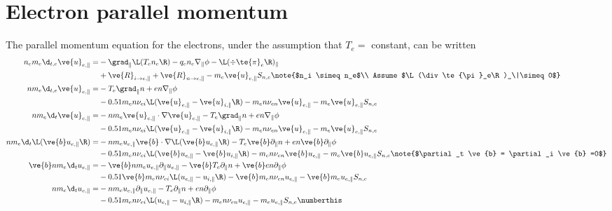 \section{Electron parallel momentum}
The parallel momentum equation for the electrons, under the assumption that $T_e=$
constant, can be written
%
\begin{align*}
 n_em_e\d_{t,e} \ve{u}_{e,\|}
 =&
 - \grad_\| \L(T_e n_e\R)
 - q_en_e \nabla_\|\phi
 - \L(\div\te{\pi}_e\R)_\|
 \\
 &
 + \ve{R}_{i\to e, \|}
 + \ve{R}_{n\to e, \|}
 - m_e\ve{u}_{e,\|}S_{n,e}
 \note{$n_i \simeq n_e$\\
     Assume $\L(\div\te{\pi}_e\R)_\|\simeq0$}
 \\
%
%
 n m_e\d_{t,e} \ve{u}_{e,\|}
 =&
 - T_e \grad_\| n
 + en \nabla_\|\phi
 \\
 &
 - 0.51 m_e n \nu_{ei}
 \L(
    \ve{u}_{e,\|}
    -
    \ve{u}_{i,\|}
 \R)
 - m_e n \nu_{en} \ve{u}_{e,\|}
 - m_e\ve{u}_{e,\|}S_{n,e}
 \\
%
%
n m_e\d_{t} \ve{u}_{e,\|}
 =&
 - n m_e \ve{u}_{e,\|} \cdot \nabla \ve{u}_{e,\|}
 - T_e \grad_\| n
 + en \nabla_\|\phi
 \\
 &
 - 0.51 m_e n \nu_{ei}
 \L(
    \ve{u}_{e,\|}
    -
    \ve{u}_{i,\|}
 \R)
 - m_e n \nu_{en}
    \ve{u}_{e,\|}
 - m_e\ve{u}_{e,\|}S_{n,e}
 \\
%
%
n m_e\d_{t} \L( \ve{b}u_{e,\|} \R)
 =&
 - n m_e u_{e,\|} \ve{b} \cdot \nabla \L(\ve{b}u_{e,\|}\R)
 - T_e \ve{b}\partial_\| n
 + en  \ve{b}\partial_\|\phi
 \\
 &
 - 0.51 m_e n \nu_{ei}
 \L(
    \ve{b}u_{e,\|}
    -
    \ve{b}u_{i,\|}
 \R)
 - m_e n \nu_{en}
    \ve{b}u_{e,\|}
 - m_e\ve{b}u_{e,\|}S_{n,e}
  \note{$\partial_t \ve{b} = \partial_i \ve{b} =0$}
 \\
%
%
\ve{b}n m_e\d_{t}  u_{e,\|}
 =&
 - \ve{b} n m_e u_{e,\|} \partial_\| u_{e,\|}
 - \ve{b}T_e \partial_\| n
 + \ve{b}en  \partial_\|\phi
 \\
 &
 - 0.51\ve{b} m_e n \nu_{ei}
 \L(
    u_{e,\|}
    -
    u_{i,\|}
 \R)
 - \ve{b}m_e n \nu_{en} u_{e,\|}
 - \ve{b}m_eu_{e,\|}S_{n,e}
 \\
%
%
n m_e\d_{t}  u_{e,\|}
 =&
 - n m_e u_{e,\|} \partial_\| u_{e,\|}
 - T_e \partial_\| n
 + en  \partial_\|\phi
 \\
 &
 - 0.51 m_e n \nu_{ei}
 \L(
    u_{e,\|}
    -
    u_{i,\|}
 \R)
 - m_e n \nu_{en} u_{e,\|}
 - m_eu_{e,\|}S_{n,e}
  \numberthis
  \label{eq:non_norm_e_mom}
\end{align*}
%


